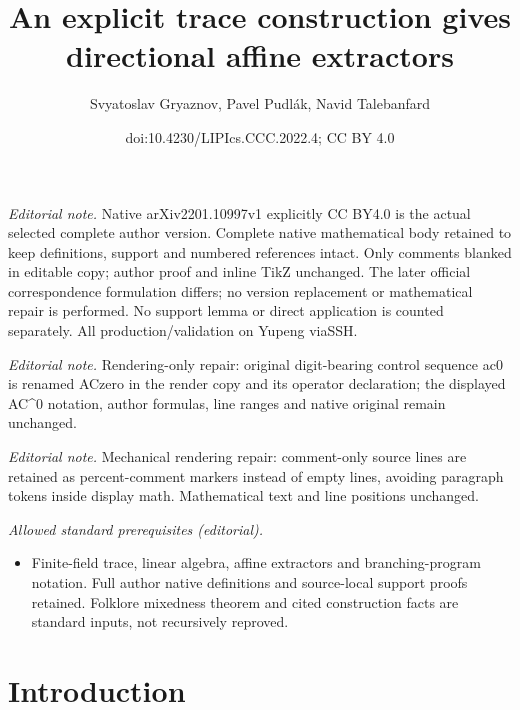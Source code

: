 \documentclass[10pt,a4paper]{article}
\title{An explicit trace construction gives directional affine extractors}
\author{Svyatoslav Gryaznov, Pavel Pudlák, Navid Talebanfard}
\date{doi:10.4230/LIPIcs.CCC.2022.4; CC BY 4.0}
\theoremstyle{definition}
\theoremstyle{remark}
\begin{document}
\maketitle
\noindent\textit{Editorial note.} Native arXiv2201.10997v1 explicitly CC BY4.0 is the actual selected complete author version. Complete native mathematical body retained to keep definitions, support and numbered references intact. Only comments blanked in editable copy; author proof and inline TikZ unchanged. The later official correspondence formulation differs; no version replacement or mathematical repair is performed. No support lemma or direct application is counted separately. All production/validation on Yupeng viaSSH.\par\medskip
\noindent\textit{Editorial note.} Rendering-only repair: original digit-bearing control sequence ac0 is renamed ACzero in the render copy and its operator declaration; the displayed AC\textasciicircum{}0 notation, author formulas, line ranges and native original remain unchanged.\par\medskip
\noindent\textit{Editorial note.} Mechanical rendering repair: comment-only source lines are retained as percent-comment markers instead of empty lines, avoiding paragraph tokens inside display math. Mathematical text and line positions unchanged.\par\medskip
\noindent\textit{Allowed standard prerequisites (editorial).}\begin{itemize}
\item Finite-field trace, linear algebra, affine extractors and branching-program notation. Full author native definitions and source-local support proofs retained. Folklore mixedness theorem and cited construction facts are standard inputs, not recursively reproved.
\end{itemize}\medskip
\section{Introduction}
\end{document}
